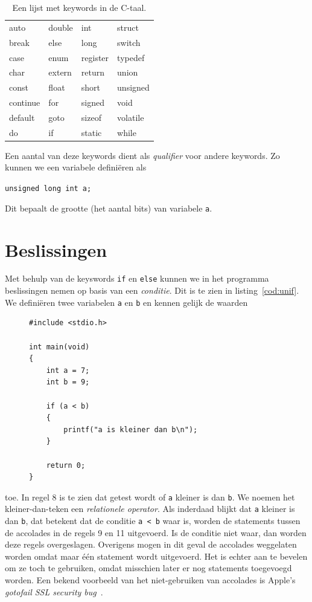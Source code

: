 \begin{table}[!ht]
\caption{Een lijst met keywords in de C-taal.}
\label{tab:unkeywords}
\centering\ttfamily
\begin{tabular}{p{2.5cm}p{2.5cm}p{2.5cm}p{2.5cm}}
\toprule
auto &  double &  int & struct \\
break & else  & long  &  switch \\
case & enum & register & typedef \\
char & extern & return & union \\
const & float & short &  unsigned \\
continue & for & signed & void \\
default & goto & sizeof & volatile \\
do & if & static & while \\
\bottomrule
\end{tabular}
\end{table}

Een aantal van deze keywords dient als \textsl{qualifier} voor andere keywords. Zo kunnen we een variabele definiëren als

\hspace*{1em}\texttt{unsigned long int a;}

Dit bepaalt de grootte (het aantal bits) van variabele \texttt{a}.


\section{Beslissingen}

Met behulp van de keyswords \texttt{if} en \texttt{else} kunnen we in het programma beslissingen nemen op basis van een \textsl{conditie}. Dit is te zien in listing~\ref{cod:unif}. We definiëren twee variabelen \texttt{a} en \texttt{b} en kennen gelijk de waarden 
%
\begin{figure}[!b]
\begin{lstlisting}[caption=Afdrukken van tekst op basis van een beslissing.,label=cod:unif]
#include <stdio.h>

int main(void)
{
    int a = 7;
    int b = 9;
    
    if (a < b)
    {
        printf("a is kleiner dan b\n");
    }
    
    return 0;
}
\end{lstlisting}
\end{figure}
%
toe. In regel 8 is te zien dat getest wordt of \texttt{a} kleiner is dan \texttt{b}. We noemen het kleiner-dan-teken een \textsl{relationele operator}. Als inderdaad blijkt dat \texttt{a} kleiner is dan \texttt{b}, dat betekent dat de conditie \texttt{a < b} waar is, worden de statements tussen de accolades in de regels 9 en 11 uitgevoerd. Is de conditie niet waar, dan worden deze regels overgeslagen. Overigens mogen in dit geval de accolades weggelaten worden omdat maar één statement wordt uitgevoerd. Het is echter aan te bevelen om ze toch te gebruiken, omdat misschien later er nog statements toegevoegd worden. Een bekend voorbeeld van het niet-gebruiken van accolades is Apple's \textsl{gotofail SSL security bug}~\cite{barr2014}.


